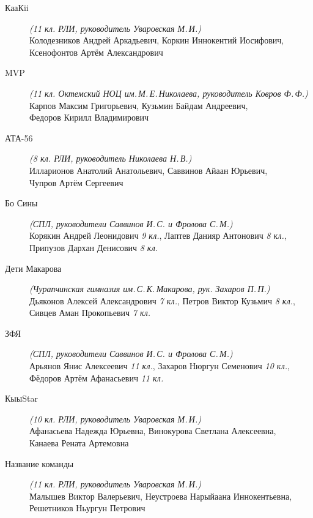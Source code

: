 \begin{description}
\item[КааКii] \textit{(11 кл. РЛИ, руководитель Уваровская М.\,И.)} \\
Колодезников Андрей Аркадьевич, Коркин Иннокентий Иосифович, \\
Ксенофонтов Артём Александрович

\item[MVP] \textit{(11 кл. Октемский НОЦ им.\,М.\,Е.\,Николаева, руководитель Ковров Ф.\,Ф.)} \\
Карпов Максим Григорьевич, Кузьмин Байдам Андреевич, \\
Федоров Кирилл Владимирович

\item[АТА-56] \textit{(8 кл. РЛИ, руководитель Николаева Н.\,В.)} \\
Илларионов Анатолий Анатольевич, Саввинов Айаан Юрьевич, \\
Чупров Артём Сергеевич

\item[Бо Сины] \textit{(СПЛ, руководители Саввинов И.\,С. и Фролова С.\,М.)} \\
Корякин Андрей Леонидович \textit{9 кл.}, Лаптев Данияр Антонович \textit{8 кл.}, \\
Припузов Дархан Денисович \textit{8 кл.}

\item[Дети Макарова] \textit{(Чурапчинская гимназия им.\,С.\,К.\,Макарова, рук. Захаров П.\,П.)} \\
Дьяконов Алексей Александрович \textit{7 кл.}, Петров Виктор Кузьмич \textit{8 кл.}, \\
Сивцев Аман Прокопьевич \textit{7 кл.}

\item[ЗФЯ] \textit{(СПЛ, руководители Саввинов И.\,С. и Фролова С.\,М.)} \\
Арьянов Янис Алексеевич \textit{11 кл.}, Захаров Нюргун Семенович \textit{10 кл.}, \\
Фёдоров Артём Афанасьевич \textit{11 кл.}

\item[КыыStar] \textit{(10 кл. РЛИ, руководитель Уваровская М.\,И.)} \\
Афанасьева Надежда Юрьевна, Винокурова Светлана Алексеевна, \\
Канаева Рената Артемовна

\item[Название команды] \textit{(11 кл. РЛИ, руководитель Уваровская М.\,И.)} \\
Малышев Виктор Валерьевич, Неустроева Нарыйаана Иннокентьевна, \\
Решетников Ньургун Петрович


\end{description}
